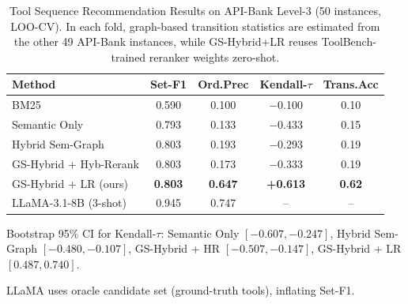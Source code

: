 \begin{table}[!t]
\caption{Tool Sequence Recommendation Results on API-Bank Level-3 (50 instances, LOO-CV). In each fold, graph-based transition statistics are estimated from the other 49 API-Bank instances, while GS-Hybrid+LR reuses ToolBench-trained reranker weights zero-shot.}
\label{tab:apibank}
\centering
\small
\begin{threeparttable}
\begin{tabular}{lcccc}
\toprule
\textbf{Method} & \textbf{Set-F1} & \textbf{Ord.Prec} & \textbf{Kendall-$\tau$} & \textbf{Trans.Acc} \\
\midrule
BM25                   & 0.590 & 0.100 & $-$0.100 & 0.10 \\
Semantic Only          & 0.793 & 0.133 & $-$0.433 & 0.15 \\
Hybrid Sem-Graph       & 0.803 & 0.193 & $-$0.293 & 0.19 \\
GS-Hybrid + Hyb-Rerank & 0.803 & 0.173 & $-$0.333 & 0.19 \\
GS-Hybrid + LR (ours)  & \textbf{0.803} & \textbf{0.647} & \textbf{+0.613} & \textbf{0.62} \\
\midrule
LLaMA-3.1-8B (3-shot)  & 0.945\tnote{$\ddagger$} & 0.747 & -- & -- \\
\bottomrule
\end{tabular}
\begin{tablenotes}
\footnotesize
\item[] Bootstrap 95\% CI for Kendall-$\tau$: Semantic Only $[-0.607,-0.247]$, Hybrid Sem-Graph $[-0.480,-0.107]$, GS-Hybrid + HR $[-0.507,-0.147]$, GS-Hybrid + LR $[0.487,0.740]$.
\item[$\ddagger$] LLaMA uses oracle candidate set (ground-truth tools), inflating Set-F1.
\end{tablenotes}
\end{threeparttable}
\end{table}
